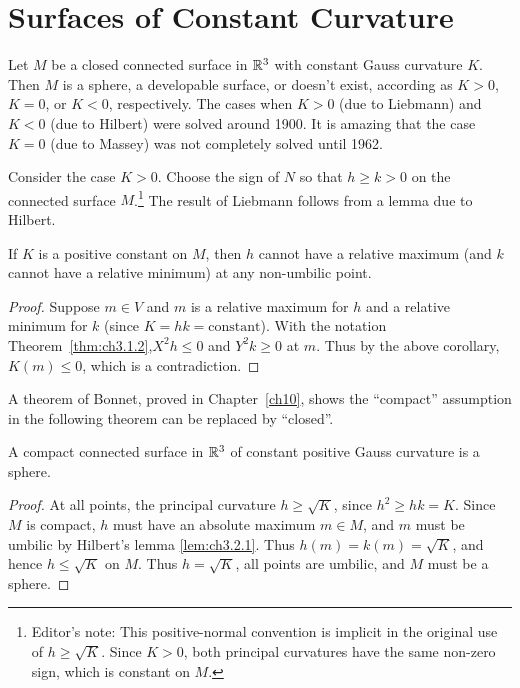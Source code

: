 \documentclass[../main]{subfiles}
\begin{document}
\section{Surfaces of Constant Curvature}\label{ch03:s2}
Let $M$ be a closed connected surface in $\mathbb{R}^3$ with constant Gauss curvature $K$. Then $M$ is a sphere, a developable surface, or doesn't exist, according as $K > 0$, $K = 0$, or $K < 0$, respectively. The cases when $K > 0$ (due to Liebmann) and $K < 0$ (due to Hilbert) were solved around 1900. It is amazing that the case $K = 0$ (due to Massey) was not completely solved until 1962.

Consider the case $K > 0$. Choose the sign of $N$ so that $h\ge k>0$ on the connected surface $M$.\footnote{Editor's note: This positive-normal convention is implicit in the original use of $h\ge\sqrt K$. Since $K>0$, both principal curvatures have the same non-zero sign, which is constant on $M$.} The result of Liebmann follows from a lemma due to Hilbert.



\begin{lemma} \label{lem:ch3.2.1}
If $K$ is a positive constant on $M$, then $h$ cannot have a relative maximum (and $k$ cannot have a relative minimum) at any non-umbilic point.
\end{lemma}

\begin{proof}
Suppose $m \in V$ and $m$ is a relative maximum for $h$ and a relative minimum for $k$ (since $K = hk = \text{constant}$). With the notation Theorem~\ref{thm:ch3.1.2},\newline  $X^2 h \le 0$ and $Y^2 k \ge 0$ at $m$. Thus by the above corollary, $K(m) \le 0$, which is a contradiction.
\end{proof}



A theorem of Bonnet, proved in Chapter~\ref{ch10}, shows the ``compact'' assumption in the following theorem can be replaced by ``closed''.



\begin{theorem} \label{thm:ch3.2.2}
A compact connected surface in $\mathbb{R}^3$ of constant positive Gauss curvature is a sphere.
\end{theorem}

\begin{proof}
At all points, the principal curvature $h \ge \sqrt K$, since $h^2 \ge hk = K$. Since $M$ is compact, $h$ must have an absolute maximum $m \in M$, and $m$ must be umbilic by Hilbert's lemma \ref{lem:ch3.2.1}. Thus $h(m) = k(m) = \sqrt K$, and hence $h \le \sqrt K$ on $M$. Thus $h = \sqrt K$, all points are umbilic, and $M$ must be a sphere.
\end{proof}
\end{document}
